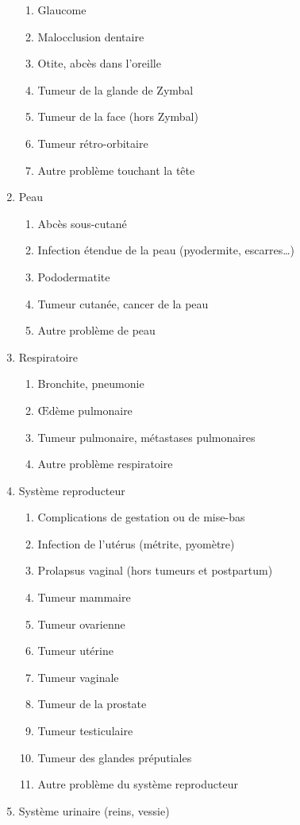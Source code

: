 \documentclass[a4paper,10pt]{article}
\begin{document}
\begin{enumerate}
\begin{enumerate}
\item Glaucome
\item Malocclusion dentaire
\item Otite, abcès dans l'oreille
\item Tumeur de la glande de Zymbal
\item Tumeur de la face (hors Zymbal)
\item Tumeur rétro-orbitaire
\item Autre problème touchant la tête
\end{enumerate}
\item Peau
\begin{enumerate}
\item Abcès sous-cutané
\item Infection étendue de la peau (pyodermite, escarres…)
\item Pododermatite
\item Tumeur cutanée, cancer de la peau
\item Autre problème de peau
\end{enumerate}
\item Respiratoire
\begin{enumerate}
\item Bronchite, pneumonie
\item Œdème pulmonaire
\item Tumeur pulmonaire, métastases pulmonaires
\item Autre problème respiratoire
\end{enumerate}
\item Système reproducteur
\begin{enumerate}
\item Complications de gestation ou de mise-bas
\item Infection de l'utérus (métrite, pyomètre)
\item Prolapsus vaginal (hors tumeurs et postpartum)
\item Tumeur mammaire
\item Tumeur ovarienne
\item Tumeur utérine
\item Tumeur vaginale
\item Tumeur de la prostate
\item Tumeur testiculaire
\item Tumeur des glandes préputiales
\item Autre problème du système reproducteur
\end{enumerate}
\item Système urinaire (reins, vessie)

\end{enumerate}
\end{document}
